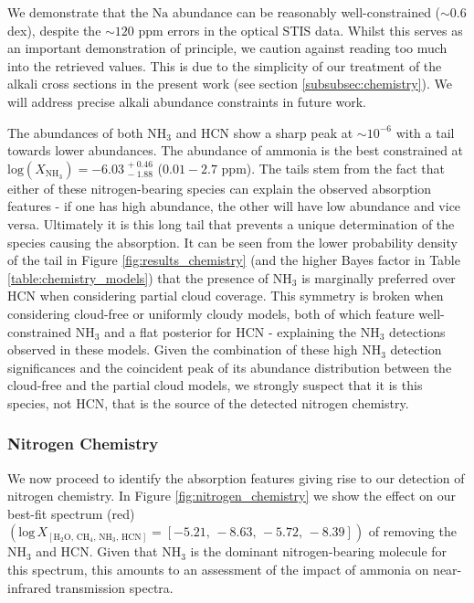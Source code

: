 \documentclass[fleqn,usenatbib]{mnras}
\begin{document}
We demonstrate that the $\mathrm{Na}$ abundance can be reasonably well-constrained ($\sim 0.6$ dex), despite the $\sim 120$ ppm errors in the optical STIS data. Whilst this serves as an important demonstration of principle, we caution against reading too much into the retrieved values. This is due to the simplicity of our treatment of the alkali cross sections in the present work (see section \ref{subsubsec:chemistry}). We will address precise alkali abundance constraints in future work.

The abundances of both $\mathrm{NH_3}$ and $\mathrm{HCN}$ show a sharp peak at $\sim 10^{-6}$ with a tail towards lower abundances. The abundance of ammonia is the best constrained at $\mathrm{log}(X_{\mathrm{NH_{3}}}) = -6.03^{\, +0.46}_{\, -1.88}$ ($0.01-2.7$ ppm). The tails stem from the fact that either of these nitrogen-bearing species can explain the observed absorption features - if one has high abundance, the other will have low abundance and vice versa. Ultimately it is this long tail that prevents a unique determination of the species causing the absorption. It can be seen from the lower probability density of the tail in Figure \ref{fig:results_chemistry} (and the higher Bayes factor in Table \ref{table:chemistry_models}) that the presence of $\mathrm{NH_3}$ is marginally preferred over $\mathrm{HCN}$ when considering partial cloud coverage. This symmetry is broken when considering cloud-free or uniformly cloudy models, both of which feature well-constrained $\mathrm{NH_3}$ and a flat posterior for $\mathrm{HCN}$ - explaining the $\mathrm{NH_3}$ detections observed in these models. Given the combination of these high $\mathrm{NH_3}$ detection significances and the coincident peak of its abundance distribution between the cloud-free and the partial cloud models, we strongly suspect that it is this species, not $\mathrm{HCN}$, that is the source of the detected nitrogen chemistry.

\subsubsection{Nitrogen Chemistry}\label{subsubsection:nitrogen_chemistry}

We now proceed to identify the absorption features giving rise to our detection of nitrogen chemistry. In Figure \ref{fig:nitrogen_chemistry} we show the effect on our best-fit spectrum (red) $\left(\mathrm{log} \, X_{\mathrm{\left[H_{2}O, \, CH_{4}, \, NH_{3}, \, HCN\right]}} = [-5.21, \, -8.63, \, -5.72, \, -8.39]\right)$ of removing the $\mathrm{NH_3}$ and $\mathrm{HCN}$. Given that $\mathrm{NH_3}$ is the dominant nitrogen-bearing molecule for this spectrum, this amounts to an assessment of the impact of ammonia on near-infrared transmission spectra.
\end{document}
